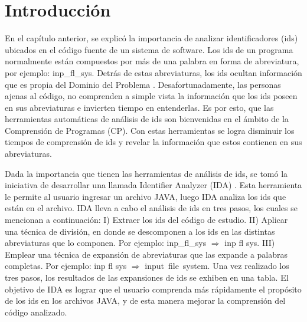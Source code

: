 \fancyhf{}
\pagestyle{fancy}
\lhead[]{\leftmark}
\chead[]{}
\rhead[]{\thepage}
\renewcommand{\headrulewidth}{1pt}

\section{Introducción}

En el capítulo anterior, se explicó la importancia de analizar identificadores (ids) ubicados en el código fuente de un sistema de software. Los ids de un programa normalmente están compuestos por más de una palabra en forma de abreviatura, por ejemplo: \textsf{inp\_fl\_sys}. Detrás de estas abreviaturas, los ids ocultan información que es propia del Dominio del Problema \cite{BCPT99,LFBEX07,EZH08,EHPV09}. Desafortunadamente, las personas ajenas al código, no comprenden a simple vista la información que los ids poseen en sus abreviaturas e invierten tiempo en entenderlas. Es por esto, que las herramientas automáticas de análisis de ids son bienvenidas en el ámbito de la Comprensión de Programas (CP). Con estas herramientas se logra disminuir los tiempos de comprensión de ids y revelar la información que estos contienen en sus abreviaturas.

Dada la importancia que tienen las herramientas de análisis de ids, se tomó la iniciativa de desarrollar una llamada Identifier Analyzer (IDA) \cite{AMGPM14}. Esta herramienta le permite al usuario ingresar un archivo JAVA, luego IDA analiza los ids que están en el archivo.
IDA lleva a cabo el análisis de ids en tres pasos, los cuales se mencionan a continuación: I) Extraer los ids del código de estudio. II) Aplicar una técnica de división, en donde se descomponen a los ids en las distintas abreviaturas que lo componen. Por ejemplo: \textsf{inp\_fl\_sys} $\Rightarrow$ \textsf{inp fl sys}. III) Emplear una técnica de expansión de abreviaturas que las expande a palabras completas. Por ejemplo: \textsf{inp fl sys} $\Rightarrow$ \mbox{\textsf{input file system}}. Una vez realizado los tres pasos, los resultados de las expansiones de ids se exhiben en una tabla.
El objetivo de IDA es lograr que el usuario comprenda más rápidamente el propósito de los ids en los archivos JAVA, y de esta manera mejorar la comprensión del código analizado.


